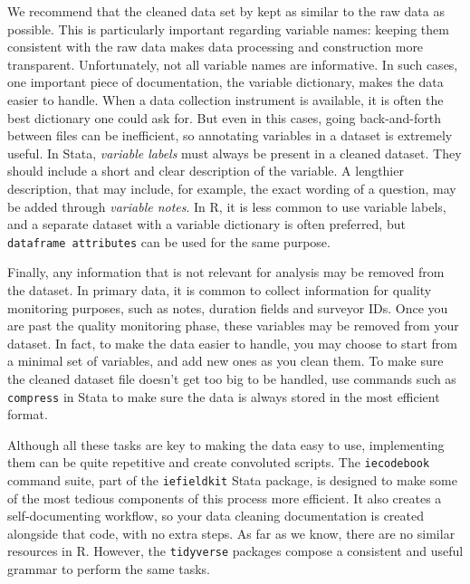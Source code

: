 We recommend that the cleaned data set by kept as similar to the raw data as possible.
This is particularly important regarding variable names:
keeping them consistent with the raw data makes data processing and construction more transparent.
Unfortunately, not all variable names are informative.
In such cases, one important piece of documentation,
the variable dictionary, makes the data easier to handle.
When a data collection instrument is available, 
it is often the best dictionary one could ask for.
But even in this cases, going back-and-forth between files can be inefficient,
so annotating variables in a dataset is extremely useful.
In Stata, \textit{variable labels} must always be present in a cleaned dataset.
They should include a short and clear description of the variable.
A lengthier description, that may include, for example,
the exact wording of a question, may be added through \textit{variable notes}.
In R, it is less common to use variable labels,
and a separate dataset with a variable dictionary is often preferred,
but \texttt{dataframe attributes} can be used for the same purpose.

Finally, any information that is not relevant for analysis may be removed from the dataset.
In primary data, it is common to collect information for quality monitoring purposes,
such as notes, duration fields and surveyor IDs.
Once you are past the quality monitoring phase,
these variables may be removed from your dataset.
In fact, to make the data easier to handle,
you may choose to start from a minimal set of variables,
and add new ones as you clean them.
To make sure the cleaned dataset file doesn't get too big to be handled,
use commands such as \texttt{compress} in Stata to make sure the data
is always stored in the most efficient format.

Although all these tasks are key to making the data easy to use,
implementing them can be quite repetitive and create convoluted scripts.
The \texttt{iecodebook} command suite, part of the \texttt{iefieldkit} Stata package,
is designed to make some of the most tedious components of this process more efficient.
It also creates a self-documenting workflow,
so your data cleaning documentation is created alongside that code,
with no extra steps.
As far as we know, there are no similar resources in R.
However, the \texttt{tidyverse} packages
compose a consistent and useful grammar to perform the same tasks.

